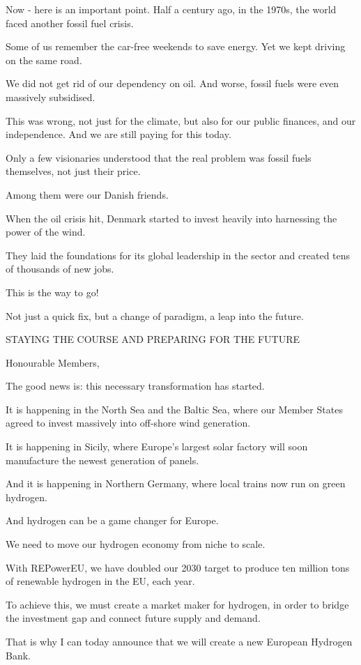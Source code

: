 \documentclass[a4paper,11pt]{article}
\begin{document}
Now - here is an important point. Half a century ago, in the 1970s, the world faced another fossil fuel crisis.

Some of us remember the car-free weekends to save energy. Yet we kept driving on the same road.

We did not get rid of our dependency on oil. And worse, fossil fuels were even massively subsidised.

This was wrong, not just for the climate, but also for our public finances, and our independence. And we are still paying for this today.

Only a few visionaries understood that the real problem was fossil fuels themselves, not just their price.

Among them were our Danish friends.

When the oil crisis hit, Denmark started to invest heavily into harnessing the power of the wind.

They laid the foundations for its global leadership in the sector and created tens of thousands of new jobs.

This is the way to go!

Not just a quick fix, but a change of paradigm, a leap into the future.

 

STAYING THE COURSE AND PREPARING FOR THE FUTURE

Honourable Members,

The good news is: this necessary transformation has started.

It is happening in the North Sea and the Baltic Sea, where our Member States agreed to invest massively into off-shore wind generation.

It is happening in Sicily, where Europe's largest solar factory will soon manufacture the newest generation of panels.

And it is happening in Northern Germany, where local trains now run on green hydrogen.

And hydrogen can be a game changer for Europe.

We need to move our hydrogen economy from niche to scale.

With REPowerEU, we have doubled our 2030 target to produce ten million tons of renewable hydrogen in the EU, each year.

To achieve this, we must create a market maker for hydrogen, in order to bridge the investment gap and connect future supply and demand.

That is why I can today announce that we will create a new European Hydrogen Bank.
\end{document}
